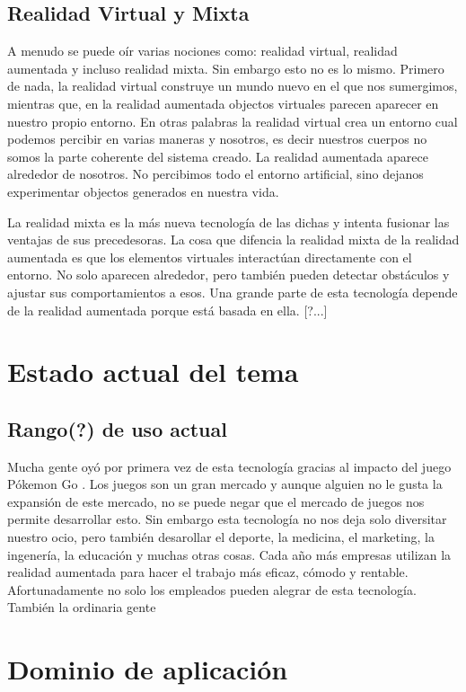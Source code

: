\documentclass[a4paper,11pt]{scrartcl}
\begin{document}
\subsection{Realidad Virtual y Mixta}
A menudo se puede oír varias nociones como: realidad virtual, realidad aumentada y incluso realidad mixta. Sin embargo esto no es lo mismo. Primero de nada, la realidad virtual construye un mundo nuevo en el que nos sumergimos, mientras que, en la realidad aumentada objectos virtuales parecen aparecer en nuestro propio entorno. En otras palabras la realidad virtual crea un entorno cual podemos percibir en varias maneras y nosotros, es decir nuestros cuerpos no somos la parte coherente del sistema creado. La realidad aumentada aparece alrededor de nosotros. No percibimos todo el entorno artificial, sino dejanos experimentar objectos generados en nuestra vida.
\par La realidad mixta es la más nueva tecnología de las dichas y intenta fusionar las ventajas de sus precedesoras. La cosa que difencia la realidad mixta de la realidad aumentada es que los elementos virtuales interactúan directamente con el entorno. No solo aparecen alrededor, pero también pueden detectar obstáculos y ajustar sus comportamientos a esos. Una grande parte de esta tecnología depende de la realidad aumentada porque está basada en ella. [?...] 

\section{Estado actual del tema}
\subsection{Rango(?) de uso actual}
Mucha gente oyó por primera vez de esta tecnología gracias al impacto del juego Pókemon Go \cite{pokemongo}. Los juegos son un gran mercado y aunque alguien no le gusta la expansión de este mercado, no se puede negar que el mercado de juegos nos permite desarrollar esto. Sin embargo esta tecnología no nos deja solo diversitar nuestro ocio, pero también desarollar el deporte, la medicina, el marketing, la ingenería, la educación y muchas otras cosas. Cada año más empresas utilizan la realidad aumentada para hacer el trabajo más eficaz, cómodo y rentable. Afortunadamente no solo los empleados pueden alegrar de esta tecnología. También la ordinaria gente

\section{Dominio de aplicación }
\end{document}
